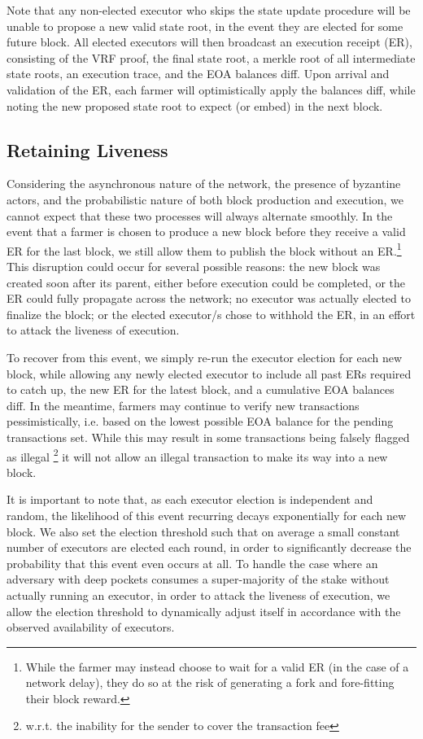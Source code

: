 \documentclass[conference]{IEEEtran}
\begin{document}
Note that any non-elected executor who skips the state update procedure will be unable to propose a new valid state root, in the event they are elected for some future block. All elected executors will then broadcast an execution receipt (ER), consisting of the VRF proof, the final state root, a merkle root of all intermediate state roots, an execution trace, and the EOA balances diff. Upon arrival and validation of the ER, each farmer will optimistically apply the balances diff, while noting the new  proposed state root to expect (or embed) in the next block.

\subsection{Retaining Liveness}

Considering the asynchronous nature of the network, the presence of byzantine actors, and the probabilistic nature of both block production and execution, we cannot expect that these two processes will always alternate smoothly. In the event that a farmer is chosen to produce a new block before they receive a valid ER for the last block, we still allow them to publish the block without an ER.\footnote{While the farmer may instead choose to wait for a valid ER (in the case of a network delay), they do so at the risk of generating a fork and fore-fitting their block reward.} This disruption could occur for several possible reasons: the new block was created soon after its parent, either before execution could be completed, or the ER could fully propagate across the network; no executor was actually elected to finalize the block; or the elected executor/s chose to withhold the ER, in an effort to attack the liveness of execution. 

To recover from this event, we simply re-run the executor election for each new block, while allowing any newly elected executor to include all past ERs required to catch up, the new ER for the latest block, and a cumulative EOA balances diff. In the meantime, farmers may continue to verify new transactions pessimistically, i.e. based on the lowest possible EOA balance for the pending transactions set. While this may result in some transactions being falsely flagged as illegal \footnote{w.r.t. the inability for the sender to cover the transaction fee} it will not allow an illegal transaction to make its way into a new block. 

It is important to note that, as each executor election is independent and random, the likelihood of this event recurring decays exponentially for each new block. We also set the election threshold such that on average a small constant number of executors are elected each round, in order to significantly decrease the probability that this event even occurs at all. To handle the case where an adversary with deep pockets consumes a super-majority of the stake without actually running an executor, in order to attack the liveness of execution, we allow the election threshold to dynamically adjust itself in accordance with the observed availability of executors.
\end{document}
